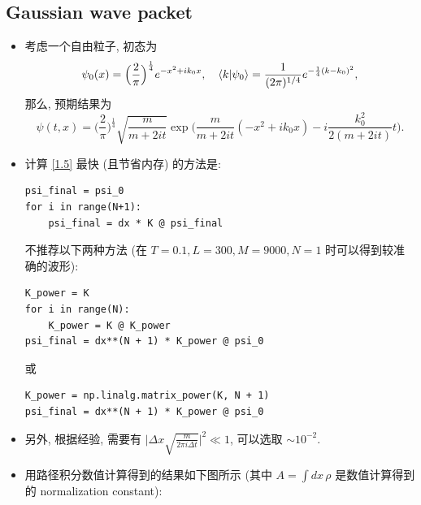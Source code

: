 \documentclass[10pt, a4paper]{article}
\numberwithin{equation}{section}
\begin{document}
	\subsection{Gaussian wave packet}
	\begin{itemize}
		\item 考虑一个自由粒子, 初态为
		\begin{equation}
			\psi_0(x) = \Big( \frac{2}{\pi} \Big)^{\frac{1}{4}} e^{- x^2 + i k_0 x}, \quad \braket{k | \psi_0} = \frac{1}{(2 \pi)^{1 / 4}} e^{- \frac{1}{4} (k - k_0)^2},
		\end{equation}
		那么, 预期结果为
		\begin{equation}
			\psi(t, x) = \Big( \frac{2}{\pi} \Big)^{\frac{1}{4}} \sqrt{\frac{m}{m + 2 i t}} \exp \Big( \frac{m}{m + 2 i t} (- x^2 + i k_0 x) - i \frac{k_0^2}{2 (m + 2 i t)} t \Big).
		\end{equation}
		
		\item 计算 \eqref{1.5} 最快 (且节省内存) 的方法是:
		\begin{lstlisting}
psi_final = psi_0
for i in range(N+1):
	psi_final = dx * K @ psi_final
		\end{lstlisting}
		不推荐以下两种方法 (在 $T = 0.1, L = 300, M = 9000, N = 1$ 时可以得到较准确的波形):
		\begin{lstlisting}
K_power = K
for i in range(N):
	K_power = K @ K_power
psi_final = dx**(N + 1) * K_power @ psi_0
		\end{lstlisting}
		或
		\begin{lstlisting}
K_power = np.linalg.matrix_power(K, N + 1)
psi_final = dx**(N + 1) * K_power @ psi_0
		\end{lstlisting}
		
		\item 另外, 根据经验, 需要有 $\big| \Delta x \sqrt{\frac{m}{2 \pi i \Delta t}} \big|^2 \ll 1$, 可以选取 $\sim 10^{- 2}$.
		
		\item 用路径积分数值计算得到的结果如下图所示 (其中 $A = \int dx \, \rho$ 是数值计算得到的 normalization constant):
		

\end{itemize}
\end{document}
